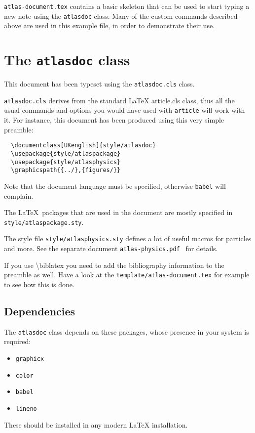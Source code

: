 \documentclass[UKenglish]{style/atlasdoc}
\newcommand{\Macro}[1]{\textbackslash #1\xspace}
\begin{document}
\noindent \texttt{atlas-document.tex} contains a basic skeleton that can be
used to start typing a new note using the \texttt{atlasdoc} class. Many of
the custom commands described above are used in this example file, in
order to demonstrate their use.


\section{The \texttt{atlasdoc} class}
\label{app:atlasdoc}

This document has been typeset using the \texttt{atlasdoc.cls} class.

\texttt{atlasdoc.cls} derives from the standard \LaTeX{} {article.cls}
class, thus all the usual commands and options you would have used
with \texttt{article} will work with it. For instance, this document has
been produced using this very simple preamble:
%
\begin{verbatim}
  \documentclass[UKenglish]{style/atlasdoc}
  \usepackage{style/atlaspackage}
  \usepackage{style/atlasphysics}
  \graphicspath{{../},{figures/}}
\end{verbatim}
%
Note that the document language must be specified, otherwise \texttt{babel} will complain.

The \LaTeX\ packages that are used in the document are mostly specified in 
\texttt{style/atlaspackage.sty}.

The style file \texttt{style/atlasphysics.sty} defines a lot of useful
macros for particles and more. See the separate document
\texttt{atlas-physics.pdf}~\cite{atlas-physics} for details.

If you use \Macro{biblatex} you need to add the bibliography information to the preamble as well.
Have a look at the \texttt{template/atlas-document.tex} for example to see how this is done.


\subsection{Dependencies}

The \texttt{atlasdoc} class depends on these packages, whose presence in
your system is required:
\begin{itemize}\setlength{\parskip}{0pt}\setlength{\itemsep}{0pt}
\item \texttt{graphicx}
\item \texttt{color}
\item \texttt{babel}
\item \texttt{lineno}
\end{itemize}
These should be installed in any modern \LaTeX{} installation.
\end{document}
